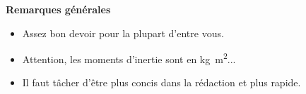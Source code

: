 \documentclass[10pt,fleqn]{book} %
\begin{document}
\textbf{Remarques générales}
\begin{itemize}
\item Assez bon devoir pour la plupart d'entre vous. 
\item Attention, les moments d'inertie sont en \si{kg.m^2}...
\item Il faut tâcher d'être plus concis dans la rédaction et plus rapide. 
\end{itemize}
%


\end{document}
